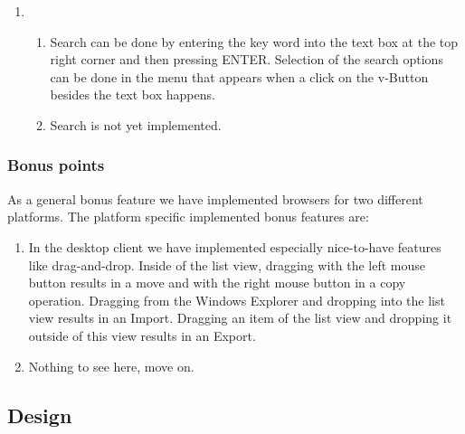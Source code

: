 \documentclass[a4paper,12pt]{article}
\begin{document}
\begin{enumerate}
		\begin{enumerate} [label={(\alph*)}]
		\item Mouse navigation is supported in the expected way. In the list view double click on a folder means going into this folder. Going to the parent folder can be done by clicking on the Back-Button.
		\item Single click on a folder to enter it, click the up button to go to the parent folder.
		\end{enumerate}
	\item
		\begin{enumerate} [label={(\alph*)}]
		\item Search can be done by entering the key word into the text box at the top right corner and then pressing ENTER. Selection of the search options can be done in the menu that appears when a click on the v-Button besides the text box happens.
		\item Search is not yet implemented.
		\end{enumerate}
\end{enumerate}

\subsubsection{Bonus points}
As a general bonus feature we have implemented browsers for two different platforms. The platform specific implemented bonus features are:
		\begin{enumerate} [label={(\alph*)}]
		\item In the desktop client we have implemented especially nice-to-have features like drag-and-drop. Inside of the list view, dragging with the left mouse button results in a move and with the right mouse button in a copy operation. Dragging from the Windows Explorer and dropping into the list view results in an Import. Dragging an item of the list view and dropping it outside of this view results in an Export.
		\item Nothing to see here, move on.
		\end{enumerate}

\subsection{Design}
\end{document}
